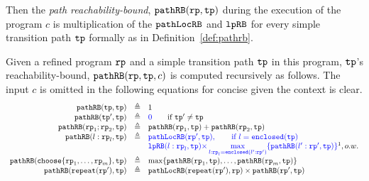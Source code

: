 Then the \emph{path reachability-bound}, $\mathtt{pathRB}(\mathtt{rp}, \mathtt{tp})$ during the execution of the program $c$ is multiplication of the $\mathtt{pathLocRB}$ and $\mathtt{lpRB}$ for every simple transition path $\mathtt{tp}$ formally as in Definition~\ref{def:pathrb}.
%
\begin{defn}
  \label{def:pathrb}
  Given a refined program $\mathtt{rp}$ and a simple transition path $\mathtt{tp}$ in this program, 
  $\mathtt{tp}$'s reachability-bound, $\mathtt{pathRB}(\mathtt{rp}, \mathtt{tp}, c)$
  is computed recursively as follows. 
  The input $c$ is omitted in the following equations for concise given the context is clear.
{\small 
\[
  \begin{array}{rcl}
    \inoutB(\tpath, \tpath) & \triangleq & 1  \\
    \inoutB(\tpath', \tpath) & \triangleq & \highlight{0} \qquad \text{if } \tpath' \neq \tpath\\
    \inoutB(\rprog_1;\rprog_2, \tpath) & \triangleq & \inoutB(\rprog_1, \tpath) + \inoutB(\rprog_2, \tpath) \\
    \inoutB(l: \rprog_l, \tpath) & \triangleq & 
    \highlight{\outinB(\rprog', \tpath), \qquad \text{if } l = \kw{enclosed}(\tpath)}
    \\
    &  & 
    \highlight{
      \lpchB(l:\rprog_l, \tpath ) }
    \highlight{\times \max\limits_{l:\rprog_l = \kw{enclosed}(l':\rprog')}
   \{\inoutB(l':\rprog', \tpath)\} } \footnotemark, o.w. \\
    \inoutB(\rpchoose{\rprog_1, \ldots, \rprog_m }, \tpath) & \triangleq 
    & \max\left\{ \inoutB(\rprog_1, \tpath), \ldots, \inoutB(\rprog_m, \tpath) \right\} 
    \\
    \inoutB(\rprepeat(\rprog'), \tpath) & \triangleq & \outinB(\rprepeat(\rprog'), \rprog) \times \inoutB(\rprog', \tpath)
    \end{array}
  \]
 }
 \end{defn}
%

